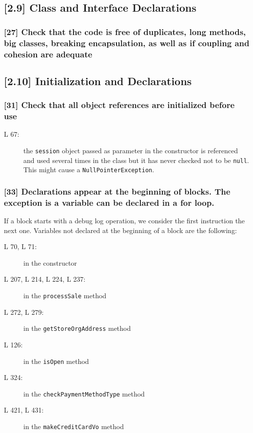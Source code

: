 \subsection*{[2.9] Class and Interface Declarations}
\subsubsection*{[27] Check that the code is free of duplicates, long methods, big classes, breaking encapsulation, as well as if coupling and cohesion are adequate}

\subsection*{[2.10] Initialization and Declarations}
\subsubsection*{[31] Check that all object references are initialized before use}
\begin{description}
	\item[L 67:] the {\tt session} object passed as parameter in the constructor is referenced and used several times in the class but it has never checked not to be {\tt null}. This might cause a {\tt NullPointerException}.
\end{description} 

\subsubsection*{[33] Declarations appear at the beginning of blocks. The exception is a variable can be declared in a for loop.}
If a block starts with a debug log operation, we consider the first instruction the next one. Variables not declared at the beginning of a block are the following:
\begin{description}
	\item[L 70, L 71:] in the constructor 
	\item[L 207, L 214, L 224, L 237:] in the {\tt processSale} method 
	\item[L 272, L 279:] in the {\tt getStoreOrgAddress} method 
	\item[L 126:] in the {\tt isOpen} method 
	\item[L 324:] in the {\tt checkPaymentMethodType} method  
	\item[L 421, L 431:] in the {\tt makeCreditCardVo} method 
\end{description}

